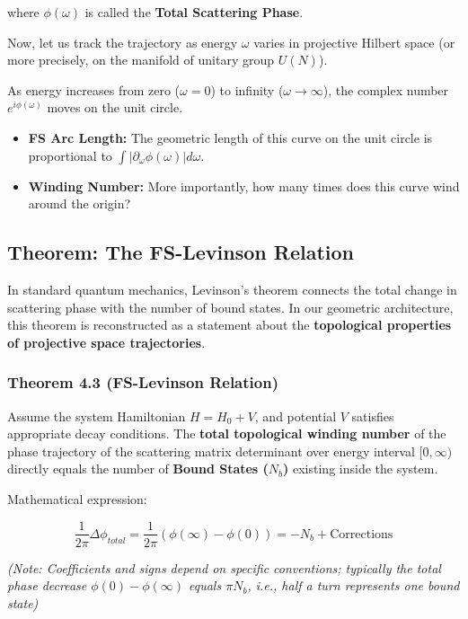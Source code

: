 \documentclass[11pt,a4paper,twoside]{book}
\begin{document}
where $\phi(\omega)$ is called the \textbf{Total Scattering Phase}.

Now, let us track the trajectory as energy $\omega$ varies in projective Hilbert space (or more precisely, on the manifold of unitary group $U(N)$).

As energy increases from zero ($\omega=0$) to infinity ($\omega \to \infty$), the complex number $e^{i\phi(\omega)}$ moves on the unit circle.

\begin{itemize}
\item \textbf{FS Arc Length:} The geometric length of this curve on the unit circle is proportional to $\int |\partial_\omega \phi(\omega)| d\omega$.

\item \textbf{Winding Number:} More importantly, how many times does this curve wind around the origin?
\end{itemize}

\subsection{Theorem: The FS-Levinson Relation}

In standard quantum mechanics, Levinson's theorem connects the total change in scattering phase with the number of bound states. In our geometric architecture, this theorem is reconstructed as a statement about the \textbf{topological properties of projective space trajectories}.

\subsubsection{Theorem 4.3 (FS-Levinson Relation)}

Assume the system Hamiltonian $H = H_0 + V$, and potential $V$ satisfies appropriate decay conditions. The \textbf{total topological winding number} of the phase trajectory of the scattering matrix determinant over energy interval $[0, \infty)$ directly equals the number of \textbf{Bound States ($N_b$)} existing inside the system.

Mathematical expression:

$$\frac{1}{2\pi} \Delta \phi_{total} = \frac{1}{2\pi} (\phi(\infty) - \phi(0)) = -N_b + \text{Corrections}$$

\textit{(Note: Coefficients and signs depend on specific conventions; typically the total phase decrease $\phi(0) - \phi(\infty)$ equals $\pi N_b$, i.e., half a turn represents one bound state)}
\end{document}
